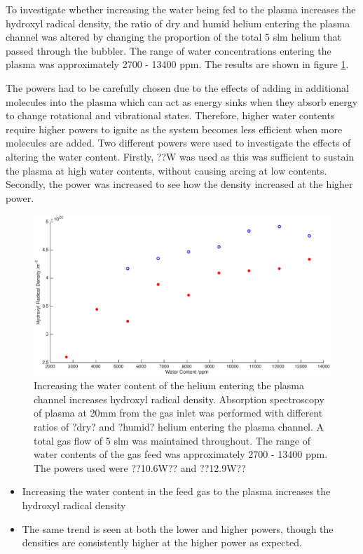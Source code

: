 \documentclass[11pt, oneside]{article}   	%
\begin{document}
To investigate whether increasing the water being fed to the plasma increases the hydroxyl radical density, the ratio of dry and humid helium entering the plasma channel was altered by changing the proportion of the total 5 slm helium that passed through the bubbler. The range of water concentrations entering the plasma was approximately 2700 - 13400 ppm. The results are shown in figure \ref{fig:BubblerVariation}.

The powers had to be carefully chosen due to the effects of adding in additional molecules into the plasma which can act as energy sinks when they absorb energy to change rotational and vibrational states. 
Therefore, higher water contents require higher powers to ignite as the system becomes less efficient when more molecules are added.
Two different powers were used to investigate the effects of altering the water content. Firstly, ??W was used as this was sufficient to sustain the plasma at high water contents, without causing arcing at low contents. Secondly, the power was increased to see how the density increased at the higher power. 

\begin{figure}
    \centering
    \includegraphics[width=\textwidth]{Figures/BubblerVariation}
    \caption{Increasing the water content of the helium entering the plasma channel increases hydroxyl radical density. Absorption spectroscopy of plasma at 20mm from the gas inlet was performed with different ratios of ?dry? and ?humid? helium entering the plasma channel. A total gas flow of 5 slm was maintained throughout. The range of water contents of the gas feed was approximately 2700 - 13400 ppm. The powers used were ??10.6W?? and ??12.9W??}
    \label{fig:BubblerVariation}
\end{figure}

\begin{itemize}
    \item Increasing the water content in the feed gas to the plasma increases the hydroxyl radical density
    \item The same trend is seen at both the lower and higher powers, though the densities are consistently higher at the higher power as expected. 
\end{itemize}
\end{document}
